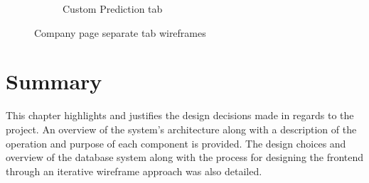 \begin{figure}[!h]
\begin{subfigure}[b]{0.3\textwidth}
                \caption{Custom Prediction tab}
                \label{fig:company_tab3}
            \end{subfigure}
            \caption{Company page separate tab wireframes}
        \end{figure}
        
    \section{Summary}
    This chapter highlights and justifies the design decisions made in regards to the project. An overview of the system's architecture along with a description of the operation and purpose of each component is provided. The design choices and overview of the database system along with the process for designing the frontend through an iterative wireframe approach was also detailed. 